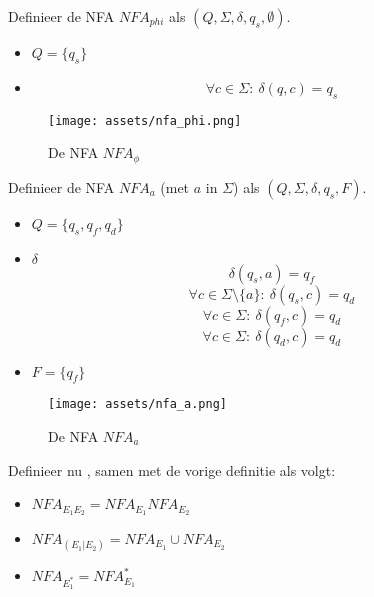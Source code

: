 \documentclass[main.tex]{subfiles}
\begin{document}
\begin{de}
  Definieer de NFA $NFA_{phi}$ als $(Q, \Sigma, \delta, q_{s}, \emptyset)$.

  \begin{itemize}
  \item $Q = \{q_{s}\}$
  \item 
    \[ \forall c \in \Sigma:\ \delta(q,c) = q_{s} \]
  \end{itemize}

  \begin{figure}[H]
    \centering
    \texttt{[image: assets/nfa\_phi.png]}      
    \caption{De NFA $NFA_{\phi}$}
    \label{fig:nfa_phi}
  \end{figure}
\end{de}

\begin{de}
  Definieer de NFA $NFA_{a}$ (met $a$ in $\Sigma$) als $(Q, \Sigma, \delta, q_{s}, F)$.

  \begin{itemize}
  \item $Q = \{q_{s},q_{f},q_{d}\}$
  \item $\delta$
    \[ \delta(q_{s}, a) = q_{f} \]
    \[ \forall c \in \Sigma\setminus\{a\}:\ \delta(q_{s}, c) = q_{d} \]
    \[ \forall c \in \Sigma:\ \delta(q_{f}, c) = q_{d}\]
    \[ \forall c \in \Sigma:\ \delta(q_{d}, c) = q_{d}\]
  \item $F = \{q_{f}\}$
  \end{itemize}

  \begin{figure}[H]
    \centering
    \texttt{[image: assets/nfa\_a.png]}      
    \caption{De NFA $NFA_{a}$}
    \label{fig:nfa_a}
  \end{figure}
\end{de}

\begin{de}
  Definieer nu , samen met de vorige definitie als volgt:
  \begin{itemize}
  \item $NFA_{E_{1}E_{2}} = NFA_{E_{1}}NFA_{E_{2}}$
  \item $NFA_{(E_{1}|E_{2})} = NFA_{E_{1}} \cup NFA_{E_{2}}$
  \item $NFA_{E_{1}^{*}} = NFA_{E_{1}}^{*}$
  \end{itemize}
\end{de}
\end{document}
